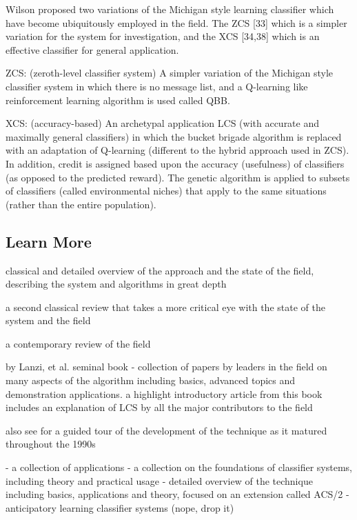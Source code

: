 \documentclass[a4paper, 11pt]{article}
\begin{document}
Wilson proposed two variations of the Michigan style learning classifier which have become ubiquitously employed in the field. The ZCS [33] which is a simpler variation for the system for investigation, and the XCS [34,38] which is an effective classifier for general application.

ZCS: (zeroth-level classifier system) A simpler variation of the Michigan style classifier system in which there is no message list, and a Q-learning like reinforcement learning algorithm is used called QBB. \cite{Wilson1994}

XCS: (accuracy-based) An archetypal application LCS (with accurate and maximally general classifiers) in which the bucket brigade algorithm is replaced with an adaptation of Q-learning (different to the hybrid approach used in ZCS). In addition, credit is assigned based upon the accuracy (usefulness) of classifiers (as opposed to the predicted reward). The genetic algorithm is applied to subsets of classifiers (called environmental niches) that apply to the same situations (rather than the entire population). \cite{Wilson1995}



% 
% 
\subsection{Learn More}

classical and detailed overview of the approach and the state of the field, describing the system and algorithms in great depth \cite{Booker1989}

a second classical review that takes a more critical eye with the state of the system and the field \cite{Wilson1989}

a contemporary review of the field \cite{Holmes2002}

by Lanzi, et al.
seminal book \cite{Lanzi2000} - collection of papers by leaders in the field on many aspects of the algorithm including basics, advanced topics and demonstration applications.
a highlight introductory article from this book includes an explanation of LCS by all the major contributors to the field \cite{Holland2000}

also see for a guided tour of the development of the technique as it matured throughout the 1990s \cite{Lanzi2000a}


\cite{Bull2004} - a collection of applications 
\cite{Bull2005} - a collection on the foundations of classifier systems, including theory and practical usage
\cite{Butz2002} - detailed overview of the technique including basics, applications and theory, focused on an extension called ACS/2 - anticipatory learning classifier systems (nope, drop it)
\end{document}
